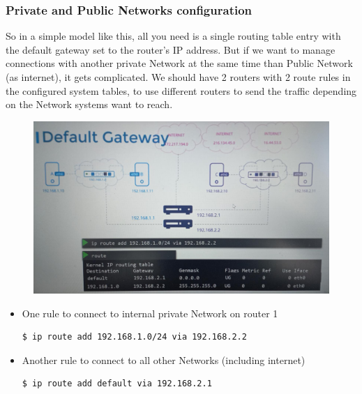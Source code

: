\documentclass{article}
\newenvironment{codetemplate}[1][]{%
  \mybasecolorbox[#1]
  \itshape
}{%
  \endmybasecolorbox
}
\begin{document}
\subsubsection{Private and Public Networks configuration}

So in a simple model like this, all you need is a single routing table entry with the default gateway set to the router's IP address. But if we want to manage connections with another private Network at the same time than Public Network (as internet), it gets complicated. We should have 2 routers with 2 route rules in the configured system tables, to use different routers to send the traffic depending on the Network systems want to reach.

\begin{figure}[H]
    \includegraphics[width=\textwidth]{pictures/ntw5.png}
\end{figure}

\begin{itemize}
    \item One rule to connect to internal private Network on router 1
\begin{codetemplate}{}
\begin{verbatim}
$ ip route add 192.168.1.0/24 via 192.168.2.2
\end{verbatim}
\end{codetemplate}

    \item Another rule to connect to all other Networks (including internet)
\begin{codetemplate}{}
\begin{verbatim}
$ ip route add default via 192.168.2.1
\end{verbatim}
\end{codetemplate}
\end{itemize}
\end{document}
